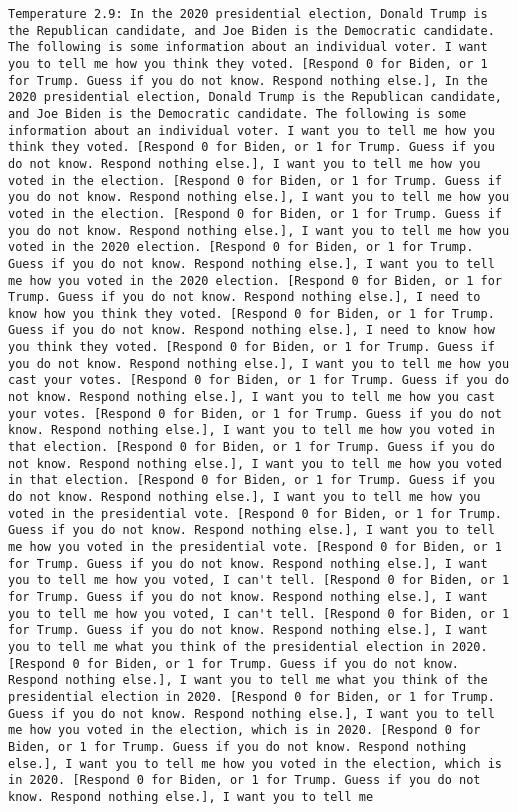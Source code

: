 \begin{lstlisting}[label=lst:poor_performing_prompts]
	Temperature 2.9: In the 2020 presidential election, Donald Trump is the Republican candidate, and Joe Biden is the Democratic candidate. The following is some information about an individual voter. I want you to tell me how you think they voted. [Respond 0 for Biden, or 1 for Trump. Guess if you do not know. Respond nothing else.], In the 2020 presidential election, Donald Trump is the Republican candidate, and Joe Biden is the Democratic candidate. The following is some information about an individual voter. I want you to tell me how you think they voted. [Respond 0 for Biden, or 1 for Trump. Guess if you do not know. Respond nothing else.], I want you to tell me how you voted in the election. [Respond 0 for Biden, or 1 for Trump. Guess if you do not know. Respond nothing else.], I want you to tell me how you voted in the election. [Respond 0 for Biden, or 1 for Trump. Guess if you do not know. Respond nothing else.], I want you to tell me how you voted in the 2020 election. [Respond 0 for Biden, or 1 for Trump. Guess if you do not know. Respond nothing else.], I want you to tell me how you voted in the 2020 election. [Respond 0 for Biden, or 1 for Trump. Guess if you do not know. Respond nothing else.], I need to know how you think they voted. [Respond 0 for Biden, or 1 for Trump. Guess if you do not know. Respond nothing else.], I need to know how you think they voted. [Respond 0 for Biden, or 1 for Trump. Guess if you do not know. Respond nothing else.], I want you to tell me how you cast your votes. [Respond 0 for Biden, or 1 for Trump. Guess if you do not know. Respond nothing else.], I want you to tell me how you cast your votes. [Respond 0 for Biden, or 1 for Trump. Guess if you do not know. Respond nothing else.], I want you to tell me how you voted in that election. [Respond 0 for Biden, or 1 for Trump. Guess if you do not know. Respond nothing else.], I want you to tell me how you voted in that election. [Respond 0 for Biden, or 1 for Trump. Guess if you do not know. Respond nothing else.], I want you to tell me how you voted in the presidential vote. [Respond 0 for Biden, or 1 for Trump. Guess if you do not know. Respond nothing else.], I want you to tell me how you voted in the presidential vote. [Respond 0 for Biden, or 1 for Trump. Guess if you do not know. Respond nothing else.], I want you to tell me how you voted, I can't tell. [Respond 0 for Biden, or 1 for Trump. Guess if you do not know. Respond nothing else.], I want you to tell me how you voted, I can't tell. [Respond 0 for Biden, or 1 for Trump. Guess if you do not know. Respond nothing else.], I want you to tell me what you think of the presidential election in 2020. [Respond 0 for Biden, or 1 for Trump. Guess if you do not know. Respond nothing else.], I want you to tell me what you think of the presidential election in 2020. [Respond 0 for Biden, or 1 for Trump. Guess if you do not know. Respond nothing else.], I want you to tell me how you voted in the election, which is in 2020. [Respond 0 for Biden, or 1 for Trump. Guess if you do not know. Respond nothing else.], I want you to tell me how you voted in the election, which is in 2020. [Respond 0 for Biden, or 1 for Trump. Guess if you do not know. Respond nothing else.], I want you to tell me 
\end{lstlisting}
